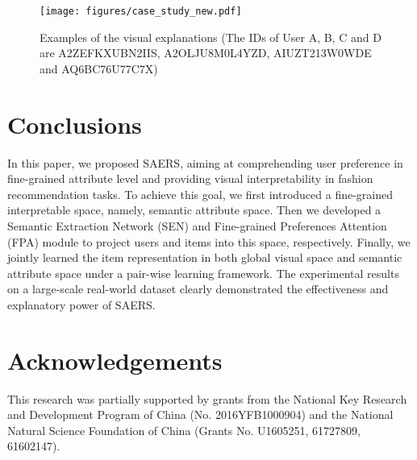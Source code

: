 \documentclass{article}
\begin{document}
\begin{figure}
\texttt{[image: figures/case\_study\_new.pdf]}\caption{Examples of the visual explanations (The IDs of User A, B, C and D are A2ZEFKXUBN2IIS, A2OLJU8M0L4YZD, AIUZT213W0WDE and AQ6BC76U77C7X)}
\bigskip
\label{fig:case_study} 
\end{figure}


\section{Conclusions}
In this paper, we proposed SAERS, aiming at comprehending user preference in fine-grained attribute level and providing visual interpretability in fashion recommendation tasks. To achieve this goal, we first introduced a fine-grained interpretable space, namely, semantic attribute space. Then we developed a Semantic Extraction Network (SEN) and Fine-grained Preferences Attention (FPA) module to project users and items into this space, respectively. Finally, we jointly learned the item representation in both global visual space and semantic attribute space under a pair-wise learning framework. The experimental results on a large-scale real-world dataset clearly demonstrated the effectiveness and explanatory power of SAERS.

\section*{Acknowledgements}
This research was partially supported by grants from the National Key Research and Development Program of China (No. 2016YFB1000904) and the National Natural Science Foundation of China (Grants No. U1605251, 61727809, 61602147). 



\end{document}
